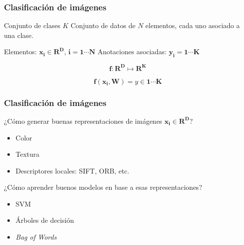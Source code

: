\documentclass{beamer}
\begin{document}
\begin{frame}
\frametitle{Clasificación de imágenes}
Conjunto de clases \(K\)\vfill
Conjunto de datos de \(N\) elementos, cada uno asociado a una clase.\vfill

Elementos: \(\boldsymbol{x_i} \in \boldsymbol{R^{D}}\), \(\boldsymbol{i =1\cdots N}\)\vfill
Anotaciones asociadas: \(\boldsymbol{y_i = 1\cdots K}\)\vfill


\begin{equation}
    \boldsymbol{f\colon R^{D} \mapsto R^{K}}
\end{equation}

\vfill

\begin{equation}
    \boldsymbol{f(x_i, W)} = y \in \boldsymbol{1 \cdots K}
\end{equation}

\vfill

\end{frame}





\begin{frame}
\frametitle{Clasificación de imágenes}
¿Cómo generar buenas representaciones de imágenes \(\boldsymbol{x_i} \in \boldsymbol{R^{D}}\)?\vfill

\begin{itemize}
    \item Color
    \item Textura 
    \item Descriptores locales: SIFT, ORB, etc.
\end{itemize}

¿Cómo aprender buenos modelos en base a esas representaciones?
\begin{itemize}
    \item SVM 
    \item Árboles de decisión 
    \item \textit{Bag of Words}
\end{itemize}
\end{frame}
\end{document}

